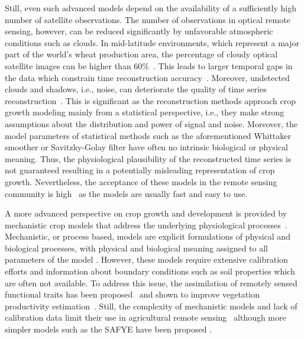 Still, even such advanced models depend on the availability of a sufficiently high number of satellite observations. The number of observations in optical remote sensing, however, can be reduced significantly by unfavorable atmospheric conditions such as clouds. In mid-latitude environments, which represent a major part of the world's wheat production area, the percentage of cloudy optical satellite images can be higher than  60\%~\citep{sudmanns_assessing_2020}. This leads to larger temporal gaps in the data which constrain time reconstruction accuracy~\citep{zhou_reconstruction_2015}. Moreover, undetected clouds and shadows, i.e., noise, can deteriorate the quality of time series reconstruction~\citep{zhou_performance_2016}. This is significant as the reconstruction methods approach crop growth modeling mainly from a statistical perspective, i.e., they make strong assumptions about the distribution and power of signal and noise. Moreover, the model parameters of statistical methods such as the aforementioned Whittaker smoother or Savitzky-Golay filter have often no intrinsic biological or physical meaning. Thus, the physiological plausibility of the reconstructed time series is not guaranteed resulting in a potentially misleading representation of crop growth. Nevertheless, the acceptance of these models in the remote sensing community is high~\citep{kooistra_reviews_2023} as the models are usually fast and easy to use.

A more advanced perspective on crop growth and development is provided by mechanistic crop models that address the underlying physiological processes~\citep{delecolle_remote_1992, jamieson_sirius_1998,keating_overview_2003}. Mechanistic, or process based, models are explicit formulations of physical and biological processes, with physical and biological meaning assigned to all parameters of the model \citep{cox_towards_2006}. However, these models require extensive calibration efforts and information about boundary conditions such as soil properties which are often not available. To address this issue, the assimilation of remotely sensed functional traits has been proposed~\citep{pellenq_methodology_2004} and shown to improve vegetation productivity estimation~\citep{huang_assimilation_2019, waldner_high_2019}. Still, the complexity of mechanistic models and lack of calibration data limit their use in agricultural remote sensing~\citep{weiss_remote_2020} although more simpler models such as the \gls{SAFYE} have been proposed \citep{ma_wheat_2022}.

